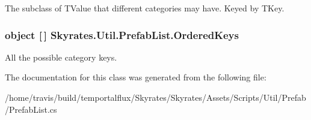 The subclass of T\-Value that different categories may have. Keyed by T\-Key. 

\hypertarget{class_skyrates_1_1_util_1_1_prefab_list_a84a3275441b5551101f11cb2f0e508fc}{
\subsubsection[{Ordered\-Keys}]{\setlength{\rightskip}{0pt plus 5cm}object \mbox{[}$\,$\mbox{]} Skyrates.\-Util.\-Prefab\-List.\-Ordered\-Keys}}\label{class_skyrates_1_1_util_1_1_prefab_list_a84a3275441b5551101f11cb2f0e508fc}


All the possible category keys. 



The documentation for this class was generated from the following file\-:\begin{DoxyCompactItemize}
\item 
/home/travis/build/temportalflux/\-Skyrates/\-Skyrates/\-Assets/\-Scripts/\-Util/\-Prefab/Prefab\-List.\-cs\end{DoxyCompactItemize}
